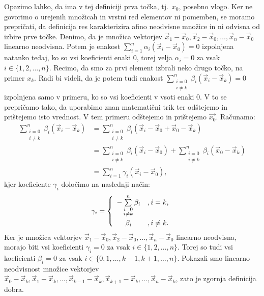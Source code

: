 \documentclass[mat1]{fmfdelo}
\newcommand{\0}{\underline{0}}
\begin{document}
Opazimo lahko, da ima v tej definiciji prva točka, tj.\ $x_0$, posebno vlogo. Ker ne govorimo o urejenih množicah in vrstni red elementov ni pomemben, se moramo prepričati, da definicija res karakterizira afino neodvisne množice in ni odvisna od izbire prve točke. Denimo, da je množica vektorjev $\vec{x}_1 - \vec{x}_0, \vec{x}_2 - \vec{x}_0, \dots , \vec{x}_n - \vec{x}_0$ linearno neodvisna. Potem je enakost $\sum\limits_{i=1}^n \alpha_i (\vec{x}_i - \vec{x}_0) = 0$ izpolnjena natanko tedaj, ko so vsi koeficienti enaki $0$, torej velja $\alpha_i = 0$ za vsak $i \in \{ 1, 2, \dots, n \}$. Recimo, da smo za prvi element izbrali neko drugo točko, na primer $x_k$. Radi bi videli, da je potem tudi enakost $\sum\limits_{\substack{i=0 \\ i\neq k}}^n \beta_i (\vec{x}_i - \vec{x}_k) = 0$ izpolnjena samo v primeru, ko so vsi koeficienti v vsoti enaki $0$. V to se prepričamo tako, da uporabimo znan matematični trik ter odštejemo in prištejemo isto vrednost. V tem primeru odštejemo in prištejemo $\vec{x_0}$.
Računamo:
\begin{align*} 
\sum\limits_{\substack{i=0 \\ i \neq k}}^n \beta_i (\vec{x}_i - \vec{x}_k) &=  \sum\limits_{\substack{i=0 \\ i \neq k}}^n \beta_i (\vec{x}_i - \vec{x}_0 + \vec{x}_0 - \vec{x}_k) \\
&=\sum\limits_{\substack{i=0 \\ i\neq k}}^n \beta_i (\vec{x}_i - \vec{x}_0) + \sum\limits_{\substack{i=0 \\ i\neq k}}^n \beta_i (\vec{x}_0 - \vec{x}_k)\\
&= \sum\limits_{i=1}^n \gamma_i (\vec{x}_i - \vec{x}_0),
\end{align*}
kjer koeficiente $\gamma_i$ določimo na naslednji način:
\[  \gamma_i =  \left\{
\begin{array}{cl}\vspace{3pt}
	-\sum\limits_{\substack{i=0 \\ i\neq k}}^n \beta_i &, i = k,\\
	\beta_i &, i \neq k. \\
\end{array} 
\right. \]
Ker je množica vektorjev $\vec{x}_1 - \vec{x}_0, \vec{x}_2 - \vec{x}_0, \dots , \vec{x}_n - \vec{x}_0$ linearno neodvisna, morajo biti vsi koeficienti $\gamma_i = 0$ za vsak $i \in \{1, 2, \dots, n \}$. Torej so tudi vsi koeficienti $\beta_i = 0$ za vsak $i \in \{0, 1, \dots, k-1, k+1, \dots, n \}$. Pokazali smo linearno neodvisnost množice vektorjev $\vec{x}_0 - \vec{x}_k, \vec{x}_1 - \vec{x}_k, \dots , \vec{x}_{k-1} - \vec{x}_k, \vec{x}_{k+1} - \vec{x}_k, \dots, \vec{x}_n - \vec{x}_k$, zato je zgornja definicija dobra. 
\end{document}
